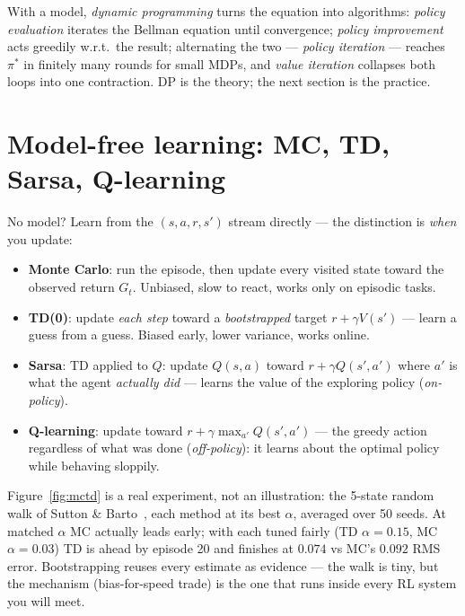 With a model, \emph{dynamic programming}
turns the equation into algorithms: \emph{policy evaluation} iterates
the Bellman equation until convergence; \emph{policy improvement}
acts greedily w.r.t.\ the result; alternating the two --- \emph{policy
iteration} --- reaches $\pi^*$ in finitely many rounds for small
MDPs, and \emph{value iteration} collapses both loops into one
contraction. DP is the theory; the next section is the practice.

\section{Model-free learning: MC, TD, Sarsa, Q-learning}
\label{sec:modelfree}

No model? Learn from the $(s,a,r,s')$ stream directly --- the
distinction is \emph{when} you update:

\begin{itemize}
\item \textbf{Monte Carlo}: run the episode, then update every
visited state toward the observed return $G_t$. Unbiased, slow to
react, works only on episodic tasks.
\item \textbf{TD(0)}: update \emph{each step}
toward a \emph{bootstrapped} target $r + \gamma V(s')$ --- learn a
guess from a guess. Biased early, lower variance, works online.
\item \textbf{Sarsa}: TD applied to $Q$: update $Q(s,a)$ toward
$r + \gamma Q(s', a')$ where $a'$ is what the agent \emph{actually
did} --- learns the value of the exploring policy (\emph{on-policy}).
\item \textbf{Q-learning}: update toward
$r + \gamma \max_{a'} Q(s',a')$ --- the greedy action regardless of
what was done (\emph{off-policy}): it learns about the optimal policy
while behaving sloppily.
\end{itemize}

\begin{example}
\label{ex:mctd}
Figure~\ref{fig:mctd} is a real experiment, not an illustration: the
5-state random walk of Sutton \& Barto~\cite{suttonbarto2018}, each
method at its best $\alpha$, averaged over 50 seeds. At matched
$\alpha$ MC actually leads early; with each tuned fairly
(TD $\alpha{=}0.15$, MC $\alpha{=}0.03$) TD is ahead by episode 20 and
finishes at $0.074$ vs MC's $0.092$ RMS error. Bootstrapping reuses
every estimate as evidence --- the walk is tiny, but the mechanism
(bias-for-speed trade) is the one that runs inside every RL system
you will meet.
\end{example}

